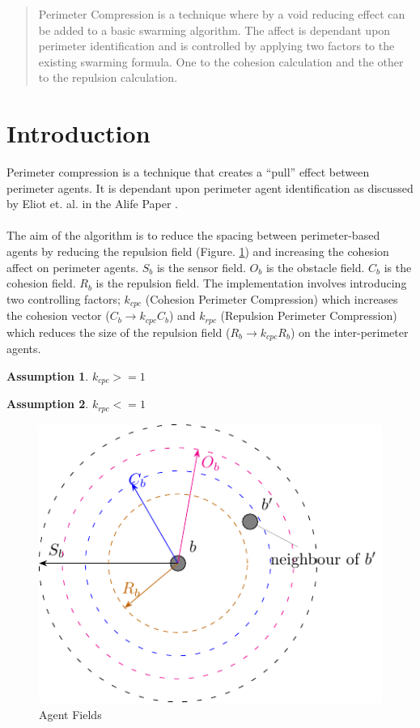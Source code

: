 \documentclass[12pt,a4paper]{article}
\newtheorem{assumption}{Assumption}
\begin{document}
\maketitle

\begin{abstract}
Perimeter Compression is a technique where by a void reducing effect can be added to a basic swarming algorithm. The affect is dependant upon perimeter identification and is controlled by applying two factors to the existing swarming formula. One to the cohesion calculation and the other to the repulsion calculation.
\end{abstract}

\section{Introduction}
Perimeter compression is a technique that creates a ``pull'' effect between perimeter agents. It is dependant upon perimeter agent identification as discussed by Eliot et. al. in the Alife Paper \cite{eliot2019void}.
\paragraph{}
The aim of the algorithm is to reduce the spacing between perimeter-based agents by reducing the repulsion field (Figure. \ref{fig:stableswarm}) and increasing the cohesion affect on perimeter agents. $S_b$ is the sensor field. $O_b$ is the obstacle field. $C_b$ is the cohesion field. $R_b$ is the repulsion field. The implementation involves introducing two controlling factors; $k_{cpc}$ (Cohesion Perimeter Compression) which increases the cohesion vector ($C_b\rightarrow k_{cpc}C_b$) and $k_{rpc}$ (Repulsion Perimeter Compression) which reduces the size of the repulsion field ($R_b\rightarrow k_{cpc}R_b$) on the inter-perimeter agents.
\begin{assumption}
	$k_{cpc} >= 1$
\end{assumption}
\begin{assumption}
	$k_{rpc} <= 1$
\end{assumption}
\begin{figure}[H]
	\centering
	\includegraphics[width=0.5\linewidth]{figures/stableswarm}
	\caption[Agent Fields]{Agent Fields}
	\label{fig:stableswarm}
\end{figure}
\end{document}
